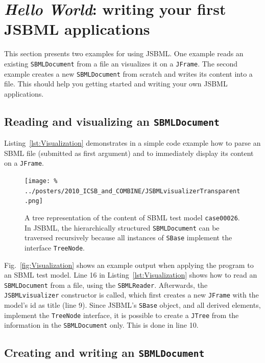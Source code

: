 \section{\emph{Hello World}: writing your first JSBML applications}

This section presents two examples for using JSBML. One example reads an
existing \texttt{SBMLDocument} from a file an visualizes it on a \texttt{JFrame}.
The second example creates a new \texttt{SBMLDocument} from scratch and writes
its content into a file. This should help you getting started and writing your
own JSBML applications.

\subsection{Reading and visualizing an \texttt{SBMLDocument}}

Listing~\vref{lst:Visualization} demonstrates in a simple code example how to
parse an SBML file (submitted as first argument) and to
immediately display its content on a \texttt{JFrame}.
%

\begin{figure}
\texttt{[image: \%
../posters/2010\_ICSB\_and\_COMBINE/JSBMLvisualizerTransparent.png]}
\caption[Tree representation of an SBML file]{A tree representation of the
content of SBML test model \texttt{case00026}. In JSBML, the hierarchically
structured \texttt{SBMLDocument} can be traversed recursively because all
instances of \texttt{SBase} implement the interface \texttt{TreeNode}.}
\label{fig:Visualization}
\end{figure}
Fig.~\vref{fig:Visualization} shows an example output when applying the program
to an SBML test model.
%
Line 16 in Listing~\vref{lst:Visualization} shows how to read an
\texttt{SBMLDocument} from a file, using the \texttt{SBMLReader}. Afterwards,
the \texttt{JSBMLvisualizer} constructor is called, which first creates a new
\texttt{JFrame} with the model's id as title (line 9). Since JSBML's
\texttt{SBase} object, and all derived elements, implement the \texttt{TreeNode}
interface, it is possible to create a \texttt{JTree} from the information in the
\texttt{SBMLDocument} only. This is done in line 10.

\subsection{Creating and writing an \texttt{SBMLDocument}}

